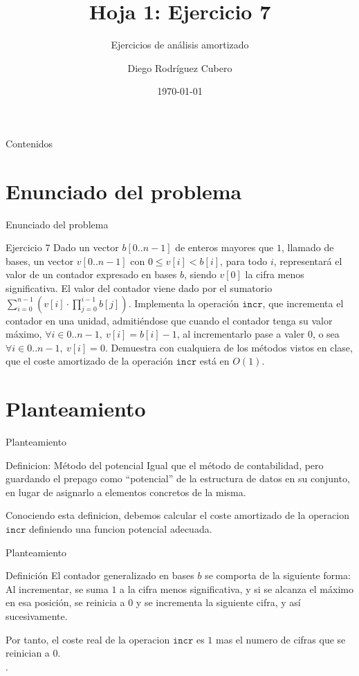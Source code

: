 \documentclass[aspectratio=169]{beamer}
\title{Hoja 1: Ejercicio 7}
\subtitle{Ejercicios de análisis amortizado}
\author{Diego Rodríguez Cubero}
\institute{UCM}
\date{\today}
\begin{document}
\begin{frame}
    \titlepage
\end{frame}

\begin{frame}{Contenidos}
    \tableofcontents
\end{frame}

\section{Enunciado del problema}
\begin{frame}{Enunciado del problema}
    \begin{block}{Ejercicio 7}
        Dado un vector $b[0..n-1]$ de enteros mayores que $1$, llamado de bases, un vector $v[0..n-1]$ con $0 \leq v[i] < b[i]$, para todo $i$, representará el valor de un contador expresado en bases $b$, siendo $v[0]$ la cifra menos significativa. El valor del contador viene dado por el sumatorio $\sum_{i=0}^{n-1} \left(v[i] \cdot \prod_{j=0}^{i-1} b[j]\right)$. Implementa la operación $\texttt{incr}$, que incrementa el contador en una unidad, admitiéndose que cuando el contador tenga su valor máximo, $\forall i \in 0..n-1,\ v[i] = b[i] - 1$, al incrementarlo pase a valer $0$, o sea $\forall i \in 0..n-1,\ v[i] = 0$. Demuestra con cualquiera de los métodos vistos en clase, que el coste amortizado de la operación $\texttt{incr}$ está en $O(1)$.
    \end{block}
\end{frame}

\section{Planteamiento}
\begin{frame}{Planteamiento}
    \begin{exampleblock}{Definicion: Método del potencial}
        Igual que el método de contabilidad, pero guardando el prepago como “potencial” de la estructura de datos en su conjunto, en lugar de asignarlo a elementos concretos de la misma.

    \end{exampleblock}
    Conociendo esta definicion, debemos calcular el coste amortizado de la operacion $\texttt{incr}$ definiendo una funcion potencial adecuada.\\
\end{frame}
\begin{frame}{Planteamiento}
    \begin{exampleblock}{Definición}
        El contador generalizado en bases $b$ se comporta de la siguiente forma:\\
        Al incrementar, se suma $1$ a la cifra menos significativa, y si se alcanza el máximo en esa posición, se reinicia a $0$ y se incrementa la siguiente cifra, y así sucesivamente.
    \end{exampleblock}
    Por tanto, el coste real de la operacion $\texttt{incr}$ es $1$ mas el numero de cifras que se reinician a $0$.\\.
\end{frame}
\end{document}
